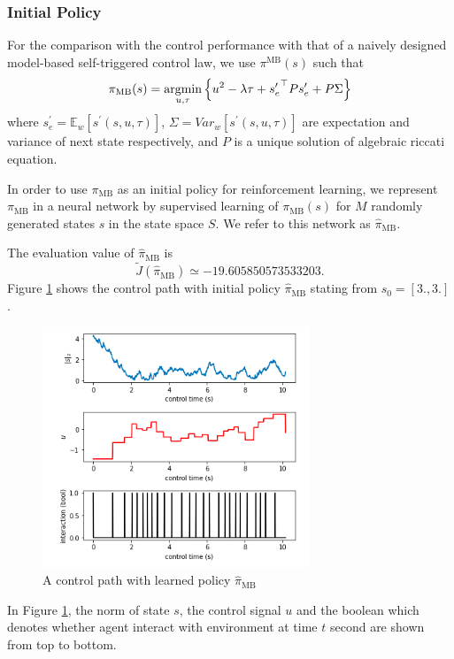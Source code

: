 \documentclass[english, dvipdfmx]{ampmt}             %
\newcommand{\argmin}{\mathop{\rm argmin}\limits}
\newcommand{\expect}{\mathbb{E}}
\begin{document}
\subsubsection{Initial Policy}
For the comparison with the control performance with that of a naively designed model-based self-triggered control law, we use $\pi^{\textrm{MB}}(s)$ such that
\begin{equation}
	\pi_{\textrm{MB}}(s) = \argmin_{u,\tau} \left\{u^2 - \lambda\tau + {s^{\prime}_e}^{\top}Ps^{\prime} _e+ P\Sigma\right\}
\end{equation}
where $s^{\prime}_e=\expect_{w}[s^{\prime}(s,u,\tau)]$, $\Sigma=Var_w[s^{\prime}(s,u,\tau)]$ are  expectation and variance of next state respectively, and $P$ is a unique solution of algebraic riccati equation.\par
In order to use $\pi_{\textrm{MB}}$ as an initial policy for reinforcement learning, we represent $\pi_{\textrm{MB}}$ in a neural network by supervised learning of $\pi_{\textrm{MB}}(s)$ for $M$ randomly generated states $s$ in the state space $S$. We refer to this network as $\hat{\pi}_{\textrm{MB}}$.\par
The evaluation value of $\hat{\pi}_{\textrm{MB}}$ is
\begin{equation}
	\tilde{J}(\hat{\pi}_{\textrm{MB}}) \simeq -19.605850573533203.
\end{equation}
Figure \ref{naiive} shows the control path with initial policy $\hat{\pi}_{\textrm{MB}}$ stating from $s_0 = [3., 3.]$.
\begin{figure}[H]
	\centering
 	\includegraphics[width=8cm]{naiive.png}
 	\caption{A control path with learned policy $\hat{\pi}_{\textrm{MB}}$} \label{naiive}
\end{figure}
In Figure \ref{naiive}, the norm of state $s$, the control signal $u$ and the boolean which denotes whether agent interact with environment at time $t$ second are shown from top to bottom.
\end{document}
